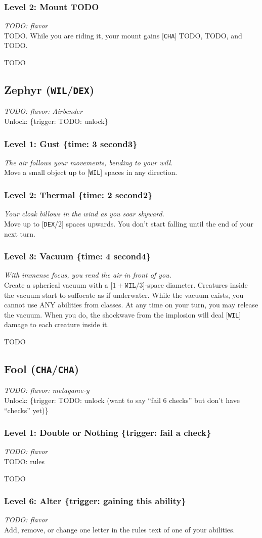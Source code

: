 \documentclass[12pt]{article}
\newcommand{\DEX}{\texttt{DEX}}
\newcommand{\WIL}{\texttt{WIL}}
\newcommand{\CHA}{\texttt{CHA}}
\newcommand{\TIME}[1]{\{time: #1 second\if1#1{}\else{s}\fi\}}
\newcommand{\TRIG}[1]{\{trigger: #1\}}
\newcommand{\Class}[4]{\pagebreak\subsection{#1 (#2)}\label{#1}\textit{#3}\\[1mm]Unlock: \TRIG{#4}}
\newcommand{\Skill}[5]{\subsubsection{Level #1: #2 #3}\textit{#4}\\[1mm]#5}
\begin{document}
\Skill{2}{Mount}{TODO}
{TODO: flavor}
{TODO. While you are riding it, your mount gains [\CHA] TODO, TODO, and TODO.}

TODO

%

%

%

%

%

%

%

%

%

%

%

%

%

%

%

%

%

%

%

%

\Class{Zephyr}{\WIL/\DEX}
{TODO: flavor: Airbender}
{TODO: unlock}

\Skill{1}{Gust}{\TIME{3}}
{The air follows your movements, bending to your will.}
{Move a small object up to [\WIL] spaces in any direction.}

\Skill{2}{Thermal}{\TIME{2}}
{Your cloak billows in the wind as you soar skyward.}
{Move up to [\DEX/2] spaces upwards. You don't start falling until the end of your next turn.}

\Skill{3}{Vacuum}{\TIME{4}}
{With immense focus, you rend the air in front of you.}
{Create a spherical vacuum with a [$1 + \WIL / 3$]-space diameter. Creatures inside the vacuum start to suffocate as if underwater. While the vacuum exists, you cannot use ANY abilities from classes. At any time on your turn, you may release the vacuum. When you do, the shockwave from the implosion will deal [\WIL] damage to each creature inside it.}

TODO

%

%

%

%

%

%

%

%

%

%

\Class{Fool}{\CHA/\CHA}
{TODO: flavor: metagame-y}
{TODO: unlock (want to say ``fail 6 checks'' but don't have ``checks'' yet)}

\Skill{1}{Double or Nothing}{\TRIG{fail a check}}
{TODO: flavor}
{TODO: rules}

TODO

\Skill{6}{Alter}{\TRIG{gaining this ability}}
{TODO: flavor}
{Add, remove, or change one letter in the rules text of one of your abilities.}
\end{document}
